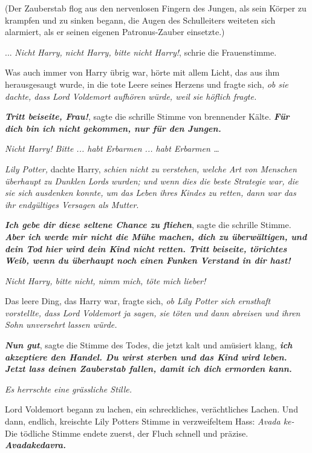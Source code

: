 (Der Zauberstab flog aus den nervenlosen Fingern des Jungen, als sein Körper zu
krampfen und zu sinken begann, die Augen des Schulleiters weiteten sich
alarmiert, als er seinen eigenen Patronus-Zauber einsetzte.)

... \glqq{}\emph{Nicht Harry, nicht Harry, bitte nicht Harry!}\grqq{}, schrie die
Frauenstimme.

Was auch immer von Harry übrig war, hörte mit allem Licht, das aus ihm
herausgesaugt wurde, in die tote Leere seines Herzens und fragte sich,\emph{ ob
sie dachte, dass Lord Voldemort aufhören würde, weil sie höflich fragte.}

\glqq{}\textbf{\emph{Tritt beiseite, Frau!}}\grqq{}, sagte die schrille Stimme
von brennender Kälte. \glqq{}\textbf{\emph{Für dich bin ich nicht gekommen, nur
für den Jungen.}}\grqq{}

\glqq{}\emph{Nicht Harry! Bitte ... habt Erbarmen ... habt Erbarmen …}\grqq{}

\emph{Lily Potter,} dachte Harry,\emph{ schien nicht zu verstehen, welche Art
von Menschen überhaupt zu Dunklen Lords wurden; und wenn dies die beste
Strategie war, die sie sich ausdenken konnte, um das Leben ihres Kindes zu
retten, dann war das ihr endgültiges Versagen als Mutter}.

\glqq{}\textbf{\emph{Ich gebe dir diese seltene Chance zu fliehen}}\grqq{}, sagte
die schrille Stimme. \glqq{}\textbf{\emph{Aber ich werde mir nicht die Mühe
machen, dich zu überwältigen, und dein Tod hier wird dein Kind nicht retten.
Tritt beiseite, törichtes Weib, wenn du überhaupt noch einen Funken Verstand in
dir hast!}}\grqq{}

\glqq{}\emph{Nicht Harry, bitte nicht, nimm mich, töte mich lieber!}\grqq{}

Das leere Ding, das Harry war, fragte sich, \emph{ob Lily Potter sich ernsthaft
vorstellte, dass Lord Voldemort ja sagen, sie töten und dann abreisen und ihren
Sohn unversehrt lassen würde.}

\glqq{}\textbf{\emph{Nun gut}}\grqq{}, sagte die Stimme des Todes, die jetzt kalt
und amüsiert klang, \glqq{}\textbf{\emph{ich akzeptiere den Handel. Du wirst
sterben und das Kind wird leben. Jetzt lass deinen Zauberstab fallen, damit ich
dich ermorden kann.}}\grqq{}

\emph{Es herrschte eine grässliche Stille.}

Lord Voldemort begann zu lachen, ein schreckliches, verächtliches Lachen. Und
dann, endlich, kreischte Lily Potters Stimme in verzweifeltem Hass: \glqq{}
\emph{Avada ke-}\grqq{} Die tödliche Stimme endete zuerst, der Fluch schnell und
präzise. \glqq{}\textbf{\emph{Avadakedavra.}}\grqq{}

